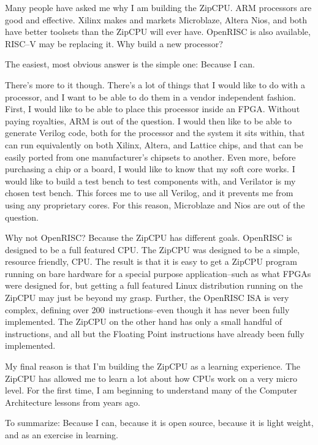 \documentclass{gqtekspec}
\begin{document}
\listoffigures
\listoftables
\begin{preface}
Many people have asked me why I am building the ZipCPU. ARM processors are
good and effective.  Xilinx makes and markets Microblaze, Altera Nios, and both
have better toolsets than the ZipCPU will ever have. OpenRISC is also
available, RISC--V may be replacing it. Why build a new processor?

The easiest, most obvious answer is the simple one: Because I can.

There's more to it though. There's a lot of things that I would like to do with
a processor, and I want to be able to do them in a vendor independent fashion.
First, I would like to be able to place this processor inside an FPGA.  Without
paying royalties, ARM is out of the question.  I would then like to be able to
generate Verilog code, both for the processor and the system it sits within,
that can run equivalently on both Xilinx, Altera, and Lattice chips, and that
can be easily ported from one manufacturer's chipsets to another. Even more,
before purchasing a chip or a board, I would like to know that my soft core
works. I would like to build a test bench to test components with, and
Verilator is my chosen test bench. This forces me to use all Verilog, and it
prevents me from using any proprietary cores. For this reason, Microblaze and
Nios are out of the question.

Why not OpenRISC? Because the ZipCPU has different goals.  OpenRISC is designed
to be a full featured CPU.  The ZipCPU was designed to be a simple, resource
friendly, CPU.  The result is that it is easy to get a ZipCPU program running
on bare hardware for a special purpose application--such as what FPGAs were
designed for, but getting a full featured
Linux distribution running on the ZipCPU may just be beyond my grasp.  Further,
the OpenRISC ISA is very complex, defining over 200~instructions--even though
it has never been fully implemented.  The ZipCPU on the other hand has only
a small handful of instructions, and all but the Floating Point instructions
have already been fully implemented.

My final reason is that I'm building the ZipCPU as a learning experience. The
ZipCPU has allowed me to learn a lot about how CPUs work on a very micro
level. For the first time, I am beginning to understand many of the Computer
Architecture lessons from years ago.

To summarize: Because I can, because it is open source, because it is light
weight, and as an exercise in learning. 

\end{preface}
\end{document}
